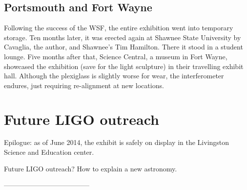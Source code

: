         \subsection{Portsmouth and Fort Wayne}
        \label{secondary_installations}


Following the success of the WSF, the entire exhibition went into temporary storage.
Ten months later, it was erected again at Shawnee State University by Cavaglia, the author, and Shawnee's Tim Hamilton.
There it stood in a student lounge.
Five months after that, Science Central, a museum in Fort Wayne, showcased the exhibition (save for the light sculpture) in their travelling exhibit hall.
Although the plexiglass is slightly worse for wear, the interferometer endures, just requiring re-alignment at new locations.


    \section{Future LIGO outreach}
    \label{future_outreach}

        Epilogue: as of June 2014, the exhibit is safely on display in the Livingston Science and Education center.

        Future LIGO outreach? How to explain a new astronomy.


        --------------------------------------




